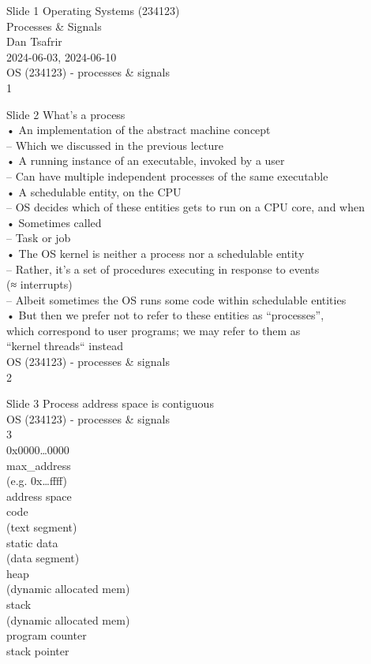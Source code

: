 \documentclass{beamer}
\begin{document}
\begin{frame}{Slide 1}
Operating Systems (234123)\\Processes \& Signals\\Dan Tsafrir \\2024-06-03, 2024-06-10\\OS (234123) - processes \& signals\\1
\end{frame}
\begin{frame}{Slide 2}
What’s a process\\• An implementation of the abstract machine concept\\– Which we discussed in the previous lecture\\• A running instance of an executable, invoked by a user\\– Can have multiple independent processes of the same executable\\• A schedulable entity, on the CPU\\– OS decides which of these entities gets to run on a CPU core, and when\\• Sometimes called\\– Task or job\\• The OS kernel is neither a process nor a schedulable entity\\– Rather, it’s a set of procedures executing in response to events \\(≈ interrupts)\\– Albeit sometimes the OS runs some code within schedulable entities\\• But then we prefer not to refer to these entities as “processes”, \\which correspond to user programs; we may refer to them as \\“kernel threads“ instead\\OS (234123) - processes \& signals\\2
\end{frame}
\begin{frame}{Slide 3}
Process address space is contiguous\\OS (234123) - processes \& signals\\3\\0x0000…0000\\max\_address\\(e.g. 0x…ffff)\\address space\\code\\(text segment)\\static data\\(data segment)\\heap\\(dynamic allocated mem)\\stack\\(dynamic allocated mem)\\program counter\\stack pointer
\end{frame}
\end{document}
